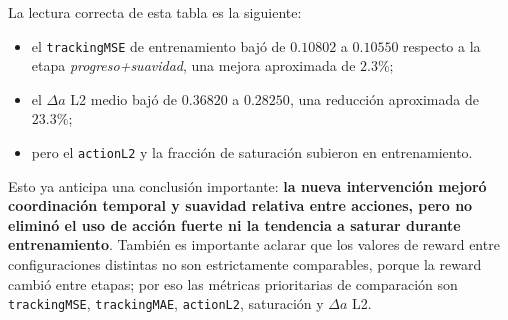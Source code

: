 \documentclass[11pt,a4paper]{article}
\begin{document}
\begin{table}[H]
\centering
\caption{Comparaci\'on de corridas recientes de entrenamiento}
\label{tab:recent-train}
\footnotesize
\setlength{\tabcolsep}{4pt}
\renewcommand{\arraystretch}{1.15}
\normalsize
\end{table}

La lectura correcta de esta tabla es la siguiente:
\begin{itemize}[leftmargin=1.2cm]
    \item el \texttt{trackingMSE} de entrenamiento baj\'o de \(0.10802\) a \(0.10550\) respecto a la etapa \emph{progreso+suavidad}, una mejora aproximada de \(2.3\%\);
    \item el \(\Delta a\) L2 medio baj\'o de \(0.36820\) a \(0.28250\), una reducci\'on aproximada de \(23.3\%\);
    \item pero el \texttt{actionL2} y la fracci\'on de saturaci\'on subieron en entrenamiento.
\end{itemize}

Esto ya anticipa una conclusi\'on importante: \textbf{la nueva intervenci\'on mejor\'o coordinaci\'on temporal y suavidad relativa entre acciones, pero no elimin\'o el uso de acci\'on fuerte ni la tendencia a saturar durante entrenamiento}. Tambi\'en es importante aclarar que los valores de reward entre configuraciones distintas no son estrictamente comparables, porque la reward cambi\'o entre etapas; por eso las m\'etricas prioritarias de comparaci\'on son \texttt{trackingMSE}, \texttt{trackingMAE}, \texttt{actionL2}, saturaci\'on y \(\Delta a\) L2.
\end{document}
